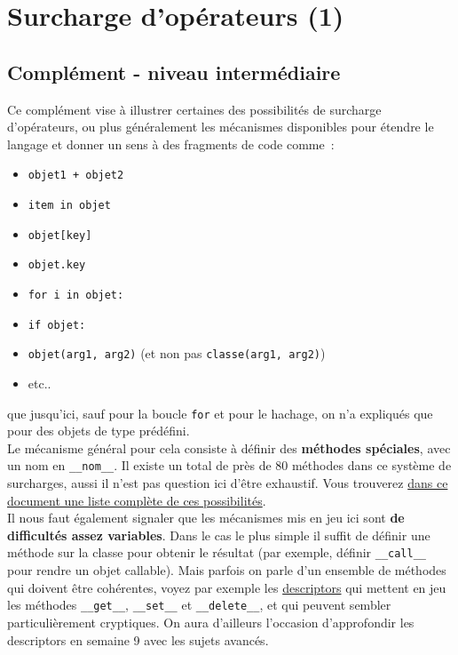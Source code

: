     \hypertarget{surcharge-dopuxe9rateurs-1}{%
\section{Surcharge d'opérateurs (1)}\label{surcharge-dopuxe9rateurs-1}}

    \hypertarget{compluxe9ment---niveau-intermuxe9diaire}{%
\subsection{Complément - niveau
intermédiaire}\label{compluxe9ment---niveau-intermuxe9diaire}}

    Ce complément vise à illustrer certaines des possibilités de surcharge
d'opérateurs, ou plus généralement les mécanismes disponibles pour
étendre le langage et donner un sens à des fragments de code comme~:

\begin{itemize}
\tightlist
\item
  \texttt{objet1\ +\ objet2}
\item
  \texttt{item\ in\ objet}
\item
  \texttt{objet{[}key{]}}
\item
  \texttt{objet.key}
\item
  \texttt{for\ i\ in\ objet:}
\item
  \texttt{if\ objet:}
\item
  \texttt{objet(arg1,\ arg2)} (et non pas \texttt{classe(arg1,\ arg2)})
\item
  etc..
\end{itemize}

que jusqu'ici, sauf pour la boucle \texttt{for} et pour le hachage, on
n'a expliqués que pour des objets de type prédéfini.\\

    Le mécanisme général pour cela consiste à définir des \textbf{méthodes
spéciales}, avec un nom en \texttt{\_\_nom\_\_}. Il existe un total de
près de 80 méthodes dans ce système de surcharges, aussi il n'est pas
question ici d'être exhaustif. Vous trouverez
\href{https://docs.python.org/3/reference/datamodel.html\#specialnames}{dans
ce document une liste complète de ces possibilités}.\\

    Il nous faut également signaler que les mécanismes mis en jeu ici sont
\textbf{de difficultés assez variables}. Dans le cas le plus simple il
suffit de définir une méthode sur la classe pour obtenir le résultat
(par exemple, définir \texttt{\_\_call\_\_} pour rendre un objet
callable). Mais parfois on parle d'un ensemble de méthodes qui doivent
être cohérentes, voyez par exemple les
\href{https://docs.python.org/3/reference/datamodel.html\#invoking-descriptors}{descriptors}
qui mettent en jeu les méthodes \texttt{\_\_get\_\_},
\texttt{\_\_set\_\_} et \texttt{\_\_delete\_\_}, et qui peuvent sembler
particulièrement cryptiques. On aura d'ailleurs l'occasion d'approfondir
les descriptors en semaine 9 avec les sujets avancés.\\

